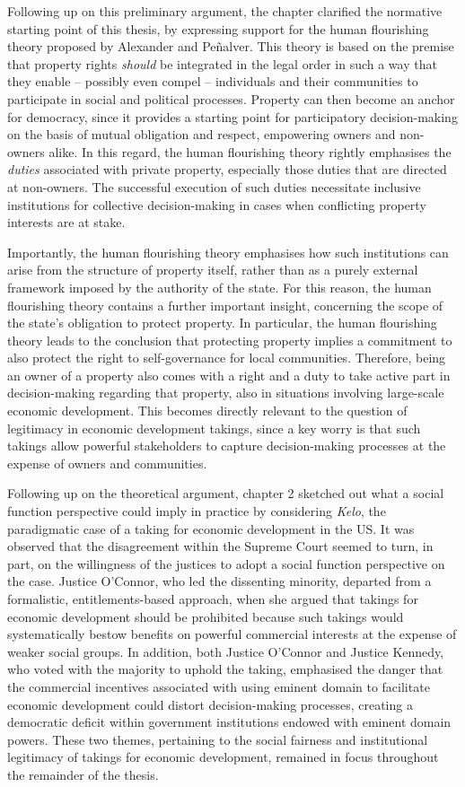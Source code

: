 Following up on this preliminary argument, the chapter clarified the normative starting point of this thesis, by expressing support for the human flourishing theory proposed by Alexander and Pe\~{n}alver. This theory is based on the premise that property rights {\it should} be integrated in the legal order in such a way that they enable -- possibly even compel -- individuals and their communities to participate in social and political processes. Property can then become an anchor for democracy, since it provides a starting point for participatory decision-making on the basis of mutual obligation and respect, empowering owners and non-owners alike. In this regard, the human flourishing theory rightly emphasises the {\it duties} associated with private property, especially those duties that are directed at non-owners. The successful execution of such duties necessitate inclusive institutions for collective decision-making in cases when conflicting property interests are at stake.

Importantly, the human flourishing theory emphasises how such institutions can arise from the structure of property itself, rather than as a purely external framework imposed by the authority of the state. For this reason, the human flourishing theory contains a further important insight, concerning the scope of the state's obligation to protect property. In particular, the human flourishing theory leads to the conclusion that protecting property implies a commitment to also protect the right to self-governance for local communities. Therefore, being an owner of a property also comes with a right and a duty to take active part in decision-making regarding that property, also in situations involving large-scale economic development. This becomes directly relevant to the question of legitimacy in economic development takings, since a key worry is that such takings allow powerful stakeholders to capture decision-making processes at the expense of owners and communities.

Following up on the theoretical argument, chapter 2 sketched out what a social function perspective could imply in practice by considering {\it Kelo}, the paradigmatic case of a taking for economic development in the US. It was observed that the disagreement within the Supreme Court seemed to turn, in part, on the willingness of the justices to adopt a social function perspective on the case. Justice O'Connor, who led the dissenting minority, departed from a formalistic, entitlements-based approach, when she argued that takings for economic development should be prohibited because such takings would systematically bestow benefits on powerful commercial interests at the expense of weaker social groups. In addition, both Justice O'Connor and Justice Kennedy, who voted with the majority to uphold the taking, emphasised the danger that the commercial incentives associated with using eminent domain to facilitate economic development could distort decision-making processes, creating a democratic deficit within government institutions endowed with eminent domain powers. These two themes, pertaining to the social fairness and institutional legitimacy of takings for economic development, remained in focus throughout the remainder of the thesis.

